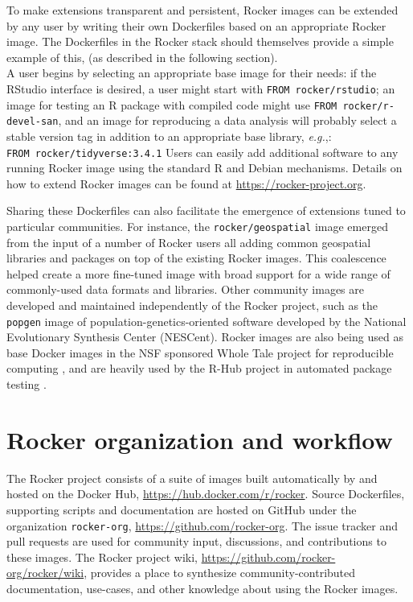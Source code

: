 To make extensions transparent and persistent, Rocker images can be
extended by any user by writing their own Dockerfiles based on an
appropriate Rocker image. The Dockerfiles in the Rocker stack should
themselves provide a simple example of this, (as described in the
following section).\\
A user begins by selecting an appropriate base image for their needs: if
the RStudio\textsuperscript{\textregistered} interface is desired, a
user might start with \texttt{FROM\ rocker/rstudio}; an image for
testing an R package with compiled code might use
\texttt{FROM\ rocker/r-devel-san}, and an image for reproducing a data
analysis will probably select a stable version tag in addition to an
appropriate base library, \emph{e.g.},:
\texttt{FROM\ rocker/tidyverse:3.4.1} Users can easily add additional
software to any running Rocker image using the standard R and Debian
mechanisms. Details on how to extend Rocker images can be found at
\url{https://rocker-project.org}.

Sharing these Dockerfiles can also facilitate the emergence of
extensions tuned to particular communities. For instance, the
\texttt{rocker/geospatial} image emerged from the input of a number of
Rocker users all adding common geospatial libraries and packages on top
of the existing Rocker images. This coalescence helped create a more
fine-tuned image with broad support for a wide range of commonly-used
data formats and libraries. Other community images are developed and
maintained independently of the Rocker project, such as the
\texttt{popgen} image of population-genetics-oriented software developed
by the National Evolutionary Synthesis Center (NESCent). Rocker images
are also being used as base Docker images in the NSF sponsored Whole
Tale project for reproducible computing \citep{wholetale}, and are
heavily used by the R-Hub project in automated package testing
\citep{rhub}.

\section{Rocker organization and
workflow}\label{rocker-organization-and-workflow}

The Rocker project consists of a suite of images built automatically by
and hosted on the Docker Hub, \url{https://hub.docker.com/r/rocker}.
Source Dockerfiles, supporting scripts and documentation are hosted on
GitHub under the organization \texttt{rocker-org},
\url{https://github.com/rocker-org}. The issue tracker and pull requests
are used for community input, discussions, and contributions to these
images. The Rocker project wiki,
\url{https://github.com/rocker-org/rocker/wiki}, provides a place to
synthesize community-contributed documentation, use-cases, and other
knowledge about using the Rocker images.

